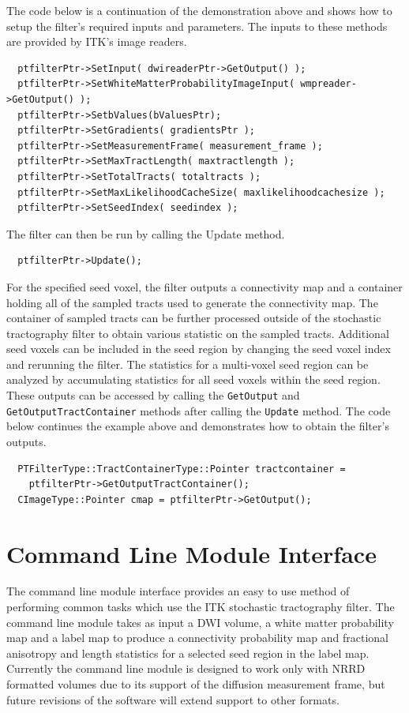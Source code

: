 The code below is a continuation of the demonstration above and shows how to setup the filter's required inputs and parameters.  The inputs to these methods are provided by ITK's image readers.
\begin{verbatim}
  ptfilterPtr->SetInput( dwireaderPtr->GetOutput() );
  ptfilterPtr->SetWhiteMatterProbabilityImageInput( wmpreader->GetOutput() );
  ptfilterPtr->SetbValues(bValuesPtr);
  ptfilterPtr->SetGradients( gradientsPtr );
  ptfilterPtr->SetMeasurementFrame( measurement_frame );
  ptfilterPtr->SetMaxTractLength( maxtractlength );
  ptfilterPtr->SetTotalTracts( totaltracts );
  ptfilterPtr->SetMaxLikelihoodCacheSize( maxlikelihoodcachesize );
  ptfilterPtr->SetSeedIndex( seedindex );
\end{verbatim}

The filter can then be run by calling the Update method.
\begin{verbatim}
  ptfilterPtr->Update();
\end{verbatim}

For the specified seed voxel, the filter outputs a connectivity map and a container holding all of the sampled tracts used to generate the connectivity map.  The container of sampled tracts can be further processed outside of the stochastic tractography filter to obtain various statistic on the sampled tracts.  Additional seed voxels can be included in the seed region by changing the seed voxel index and rerunning the filter.  The statistics for a multi-voxel seed region can be analyzed by accumulating statistics for all seed voxels within the seed region.  These outputs can be accessed by calling the  \texttt{GetOutput} and  \texttt{GetOutputTractContainer} methods after calling the  \texttt{Update} method.  The code below continues the example above and demonstrates how to obtain the filter's outputs.
\begin{verbatim}
  PTFilterType::TractContainerType::Pointer tractcontainer = 
    ptfilterPtr->GetOutputTractContainer();
  CImageType::Pointer cmap = ptfilterPtr->GetOutput();
\end{verbatim}

\section{Command Line Module Interface}
The command line module interface provides an easy to use method of performing common tasks which use the ITK stochastic tractography filter.  The command line module takes as input a DWI volume, a white matter probability map and a label map to produce a connectivity probability map and fractional anisotropy and length statistics for a selected seed region in the label map.  Currently the command line module is designed to work only with NRRD formatted volumes due to its support of the diffusion measurement frame, but future revisions of the software will extend support to other formats.

